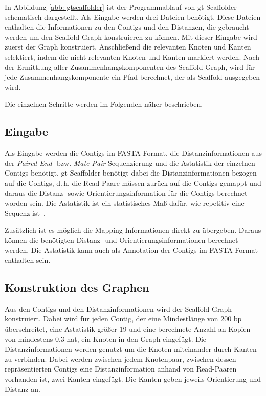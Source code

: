 \documentclass[a4paper,10pt,parskip]{scrartcl}
\begin{document}
In Abbildung \ref{abb: gtscaffolder} ist der Programmablauf von gt
Scaffolder schematisch dargestellt. Als Eingabe werden drei Dateien
benötigt. Diese Dateien enthalten die Informationen zu den Contigs und
den Distanzen, die gebraucht werden um den Scaffold-Graph konstruieren
zu können. Mit dieser Eingabe wird zuerst der Graph
konstruiert. Anschließend die relevanten Knoten und Kanten selektiert,
indem die nicht relevanten Knoten und Kanten  markiert werden. Nach der
Ermittlung aller Zusammenhangskomponenten des Scaffold-Graph, wird für
jede Zusammenhangskomponente ein Pfad berechnet, der als Scaffold
ausgegeben wird.

Die einzelnen Schritte werden im Folgenden näher
beschrieben.

\subsection{Eingabe}
Als Eingabe werden die Contigs im FASTA-Format, die
Distanzinformationen aus der \textit{Paired-End}-
bzw. \textit{Mate-Pair}-Sequenzierung und die Astatistik der einzelnen
Contigs benötigt. gt Scaffolder benötigt dabei die
Distanzinformationen bezogen auf die Contigs, d.\,h. die Read-Paare
müssen zurück auf die Contigs gemappt und daraus die Distanz- sowie
Orientierungsinformation für die Contigs berechnet worden sein. Die
Astatistik ist ein statistisches Maß dafür, wie repetitiv eine Sequenz
ist~\cite{Myers:2005iq}.

Zusätzlich ist es möglich die Mapping-Informationen direkt zu
übergeben. Daraus können die benötigten Distanz- und
Orientierungsinformationen berechnet werden. Die Astatistik kann auch
als Annotation der Contigs im FASTA-Format enthalten sein.

\subsection{Konstruktion des Graphen}
Aus den Contigs und den Distanzinformationen wird der Scaffold-Graph
konstruiert. Dabei wird für jeden Contig, der eine Mindestlänge von
200 bp überschreitet, eine Astatistik größer 19 und eine berechnete
Anzahl an Kopien von mindestens \num{0.3} hat, ein Knoten in den Graph
eingefügt. Die Distanzinformationen werden genutzt um die Knoten
miteinander durch Kanten zu verbinden. Dabei werden zwischen jedem
Knotenpaar, zwischen dessen repräsentierten Contigs eine
Distanzinformation anhand von Read-Paaren vorhanden ist, zwei Kanten
eingefügt. Die Kanten geben jeweils Orientierung und Distanz an.
\end{document}
